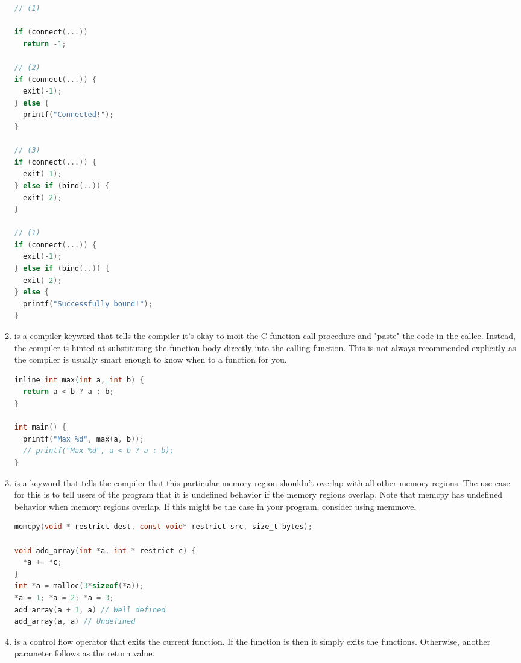 \begin{enumerate}
	      \begin{lstlisting}[language=C]
// (1)

if (connect(...))
  return -1;

// (2)
if (connect(...)) {
  exit(-1);
} else {
  printf("Connected!");
}

// (3)
if (connect(...)) {
  exit(-1);
} else if (bind(..)) {
  exit(-2);
}

// (1)
if (connect(...)) {
  exit(-1);
} else if (bind(..)) {
  exit(-2);
} else {
  printf("Successfully bound!");
}
\end{lstlisting}

	    \item {} is a compiler keyword that tells the compiler it's okay to moit the C function call procedure and "paste" the code in the callee.
        Instead, the compiler is hinted at substituting the function body directly into the calling function.
        This is not always recommended explicitly as the compiler is usually smart enough to know when to  a function for you.

	      \begin{lstlisting}[language=C]
inline int max(int a, int b) {
  return a < b ? a : b;
}

int main() {
  printf("Max %d", max(a, b));
  // printf("Max %d", a < b ? a : b);
}
\end{lstlisting}

	    \item {} is a keyword that tells the compiler that this particular memory region shouldn't overlap with all other memory regions.
        The use case for this is to tell users of the program that it is undefined behavior if the memory regions overlap.
        Note that memcpy has undefined behavior when memory regions overlap.
        If this might be the case in your program, consider using memmove.

	      \begin{lstlisting}[language=C]
memcpy(void * restrict dest, const void* restrict src, size_t bytes);

void add_array(int *a, int * restrict c) {
  *a += *c;
}
int *a = malloc(3*sizeof(*a));
*a = 1; *a = 2; *a = 3;
add_array(a + 1, a) // Well defined
add_array(a, a) // Undefined
\end{lstlisting}

	    \item {} is a control flow operator that exits the current function.
        If the function is  then it simply exits the functions.
        Otherwise, another parameter follows as the return value.


\end{enumerate}
